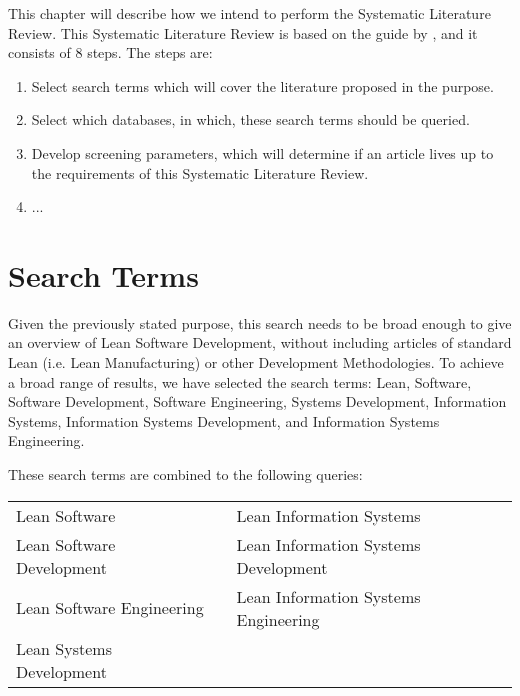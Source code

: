 This chapter will describe how we intend to perform the Systematic Literature Review.
This Systematic Literature Review is based on the guide by \citet{okoli}, and it consists of 8 steps. The steps are:
\begin{enumerate}
	\item Select search terms which will cover the literature proposed in the purpose.
	\item Select which databases, in which, these search terms should be queried.
	\item Develop screening parameters, which will determine if an article lives up to the requirements of this Systematic Literature Review.
	\item ...
\end{enumerate}

\section{Search Terms}
Given the previously stated purpose, this search needs to be broad enough to give an overview of Lean Software Development, without including articles of standard Lean (i.e. Lean Manufacturing) or other Development Methodologies. 
To achieve a broad range of results, we have selected the search terms: 
Lean, 
Software, 
Software Development, 
Software Engineering, 
Systems Development, 
Information Systems, 
Information Systems Development, 
and Information Systems Engineering.

These search terms are combined to the following queries:
\begin{table}[H]
	\centering
	\begin{tabular}{ l c l }
		\tabitem Lean Software  & \hspace{1cm} & \tabitem Lean Information Systems \\ 
		\tabitem Lean Software Development & \hspace{1cm} & \tabitem Lean Information Systems Development\\ 
		\tabitem Lean Software Engineering & \hspace{1cm} & \tabitem Lean Information Systems Engineering\\ 
		\tabitem Lean Systems Development & \hspace{1cm} & \\  
	\end{tabular}
\end{table} 

